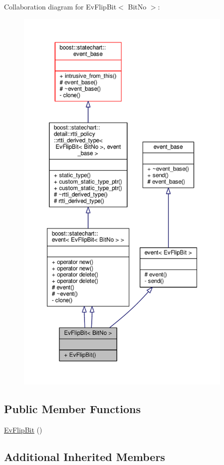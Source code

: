 Collaboration diagram for Ev\+Flip\+Bit$<$ Bit\+No $>$\+:
\nopagebreak
\begin{figure}[H]
\begin{center}
\leavevmode
\includegraphics[height=550pt]{struct_ev_flip_bit__coll__graph}
\end{center}
\end{figure}
\subsection*{Public Member Functions}
\begin{DoxyCompactItemize}
\item 
\mbox{\hyperlink{struct_ev_flip_bit_a87ac8da76c92a67d503bc7774e1ae84e}{Ev\+Flip\+Bit}} ()
\end{DoxyCompactItemize}
\subsection*{Additional Inherited Members}


